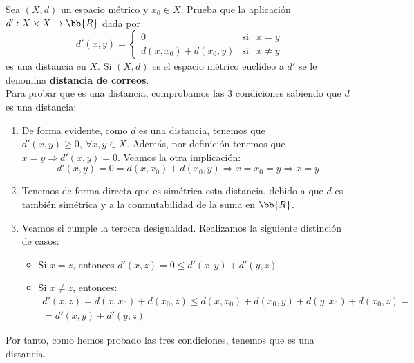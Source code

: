 \begin{ejercicio}
    Sea $(X,d)$ un espacio métrico y $x_0\in X$. Prueba que la aplicación $d':X\times X\to \bb{R}$ dada por
    \begin{equation*}
        d'(x,y)=\left\{
            \begin{array}{ccc}
                0 & \text{si} & x=y \\
                d(x,x_0) + d(x_0,y) & \text{si} & x\neq y
            \end{array}
        \right.
    \end{equation*}
    es una distancia en $X$. Si $(X,d)$ es el espacio métrico euclídeo a $d'$ se le denomina \textbf{distancia de correos}.\\

    Para probar que es una distancia, comprobamos las 3 condiciones sabiendo que $d$ es una distancia:
    \begin{enumerate}
        \item De forma evidente, como $d$ es una distancia, tenemos que $d'(x,y)\geq 0,~\forall x,y\in X$. Además, por definición tenemos que $x=y\Longrightarrow d'(x,y)=0$. Veamos la otra implicación: 
        \begin{equation*}
            d'(x,y)=0=d(x,x_0)+d(x_0,y) \Longrightarrow x=x_0=y\Longrightarrow x=y
        \end{equation*}

        \item Tenemos de forma directa que es simétrica esta distancia, debido a que $d$ es también simétrica y a la conmutabilidad de la suma en $\bb{R}$.

        \item Veamos si cumple la tercera desigualdad. Realizamos la siguiente distinción de casos:
        \begin{itemize}
            \item Si $x=z$, entonces $d'(x,z)=0\leq d'(x,y)+d'(y,z)$.

            \item Si $x\neq z$, entonces:
            \begin{multline*}
                d'(x,z)=d(x,x_0) + d(x_0,z)
                \leq d(x,x_0) + d(x_0,y) + d(y,x_0) + d(x_0,z)=\\=
                d'(x,y) + d'(y,z)
            \end{multline*}
        \end{itemize}
    \end{enumerate}

    Por tanto, como hemos probado las tres condiciones, tenemos que es una distancia.
\end{ejercicio}


